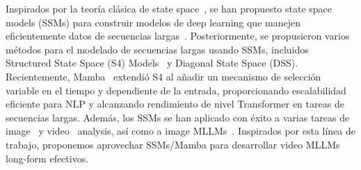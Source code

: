 Inspirados por la teoría clásica de state space~\cite{kalman1960new}, se han propuesto state space models (SSMs) para construir modelos de deep learning que manejen eficientemente datos de secuencias largas~\cite{gu2020hippo, gu2021combining, gu2022efficiently}. Posteriormente, se propusieron varios métodos para el modelado de secuencias largas usando SSMs, incluidos Structured State Space (S4) Models~\cite{gu2022efficiently} y Diagonal State Space (DSS)\cite{gupta2022diagonal}. Recientemente, Mamba~\cite{gu2023mamba} extendió S4 al añadir un mecanismo de selección variable en el tiempo y dependiente de la entrada, proporcionando escalabilidad eficiente para NLP y alcanzando rendimiento de nivel Transformer en tareas de secuencias largas. Además, los SSMs se han aplicado con éxito a varias tareas de image~\cite{zhu2024vision, pei2024efficientvmamba, pei2024efficientvmamba, chen2024rsmamba} y video~\cite{yang2024vivim,li2025videomamba,lu2024videomambapro,chaudhuri2024simba,islam2022long,islam2023efficient} analysis, así como a image MLLMs~\cite{qiao2024vl,zhao2024cobra}. Inspirados por esta línea de trabajo, proponemos aprovechar SSMs/Mamba para desarrollar video MLLMs long-form efectivos.
